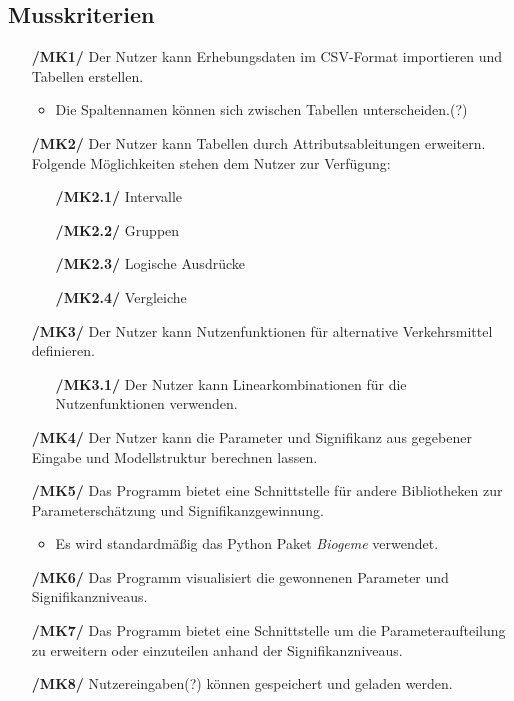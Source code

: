 \documentclass{article}
\begin{document}
\subsection{Musskriterien}
\begin{itemize}
    \item[\textbf{/MK1/}] Der Nutzer kann Erhebungsdaten im CSV-Format importieren und Tabellen erstellen.
    \begin{itemize}
        \item Die Spaltennamen können sich zwischen Tabellen unterscheiden.(?)
    \end{itemize}
    \item[\textbf{/MK2/}] Der Nutzer kann Tabellen durch Attributsableitungen erweitern.
    \subitem Folgende Möglichkeiten stehen dem Nutzer zur Verfügung:
    \begin{itemize}[leftmargin=.7in]
        \item[\textbf{/MK2.1/}] Intervalle
        \item[\textbf{/MK2.2/}] Gruppen
        \item[\textbf{/MK2.3/}] Logische Ausdrücke
        \item[\textbf{/MK2.4/}] Vergleiche
    \end{itemize}
    \item[\textbf{/MK3/}] Der Nutzer kann Nutzenfunktionen für alternative Verkehrsmittel definieren.
    \begin{itemize}[leftmargin=.7in]
        \item[\textbf{/MK3.1/}] Der Nutzer kann Linearkombinationen für die Nutzenfunktionen verwenden.
    \end{itemize}
    \item[\textbf{/MK4/}] Der Nutzer kann die Parameter und Signifikanz aus gegebener Eingabe und Modellstruktur berechnen lassen.
    \item[\textbf{/MK5/}] Das Programm bietet eine Schnittstelle für andere Bibliotheken zur Parameterschätzung und Signifikanzgewinnung. 
    \begin{itemize}
        \item Es wird standardmäßig das Python Paket \textit{Biogeme} verwendet.
    \end{itemize}
    \item[\textbf{/MK6/}] Das Programm visualisiert die gewonnenen Parameter und Signifikanzniveaus.
    \item[\textbf{/MK7/}] Das Programm bietet eine Schnittstelle um die Parameteraufteilung zu erweitern oder einzuteilen anhand der Signifikanzniveaus.
    \item[\textbf{/MK8/}] Nutzereingaben(?) können gespeichert und geladen werden.
\end{itemize}
\end{document}
